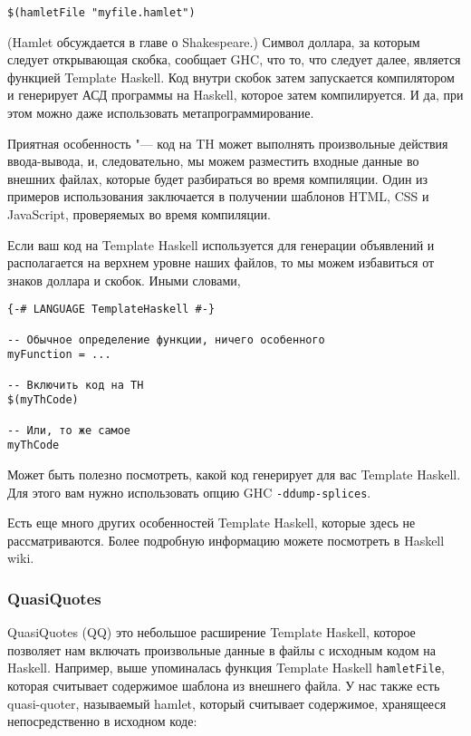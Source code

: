\begin{lstlisting}
$(hamletFile "myfile.hamlet")
\end{lstlisting}

(Hamlet обсуждается в главе о Shakespeare.) Символ доллара, за которым следует открывающая скобка, сообщает GHC, что то, что следует далее, является функцией Template Haskell. Код внутри скобок затем запускается компилятором и генерирует АСД программы на Haskell, которое затем компилируется. И да, при этом можно даже использовать метапрограммирование.

Приятная особенность "--- код на TH может выполнять произвольные действия ввода-вывода, и, следовательно, мы можем разместить входные данные во внешних файлах, которые будет разбираться во время компиляции. Один из примеров использования заключается в получении шаблонов HTML, CSS и JavaScript, проверяемых во время компиляции.

Если ваш код на Template Haskell используется для генерации объявлений и располагается на верхнем уровне наших файлов, то мы можем избавиться от знаков доллара и скобок. Иными словами,

\begin{lstlisting}
{-# LANGUAGE TemplateHaskell #-}

-- Обычное определение функции, ничего особенного
myFunction = ...

-- Включить код на TH
$(myThCode)

-- Или, то же самое
myThCode
\end{lstlisting}

Может быть полезно посмотреть, какой код генерирует для вас Template Haskell. Для этого вам нужно использовать опцию GHC \lstinline'-ddump-splices'.

Есть еще много других особенностей Template Haskell, которые здесь не рассматриваются. Более подробную информацию можете посмотреть в Haskell wiki.

\subsubsection{QuasiQuotes}

QuasiQuotes (QQ) это небольшое расширение Template Haskell, которое позволяет нам включать произвольные данные в файлы с исходным кодом на Haskell. Например, выше упоминалась функция Template Haskell \lstinline'hamletFile', которая считывает содержимое шаблона из внешнего файла. У нас также есть quasi-quoter, называемый hamlet, который считывает содержимое, хранящееся непосредственно в исходном коде:

